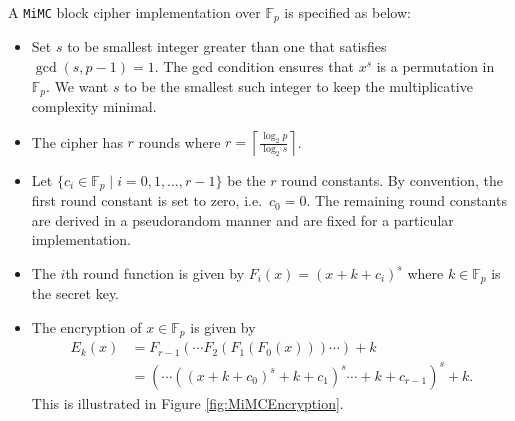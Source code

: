 \documentclass[10pt]{article}
\begin{document}
A \texttt{MiMC} block cipher implementation over $\mathbb{F}_p$ is specified as below:
\begin{itemize}
  \item Set $s$ to be smallest integer greater than one that satisfies $\gcd(s, p-1)=1$. The gcd condition ensures that $x^s$ is a permutation in $\mathbb{F}_p$. We want $s$ to be the smallest such integer to keep the multiplicative complexity minimal.
  \item The cipher has $r$ rounds where $r = \left\lceil \frac{\log_2 p}{\log_2 s}  \right\rceil$.
  \item Let $\{c_i \in \mathbb{F}_p \mid i=0,1,\ldots,r-1 \}$ be the $r$ round constants. By convention, the first round constant is set to zero, i.e.~$c_0= 0$. The remaining round constants are derived in a pseudorandom manner and are fixed for a particular implementation.
  \item The $i$th round function is given by $F_i(x) = (x + k + c_i)^s$ where $k \in \mathbb{F}_p$ is the secret key.
  \item The encryption of $x \in \mathbb{F}_p$ is given by
    \begin{align*}
      E_k(x) & = F_{r-1}(\cdots F_2(F_1(F_0(x))) \cdots) + k\\
             & = \left(\cdots \left((x+k+c_0)^s + k + c_1\right)^s \cdots + k + c_{r-1}\right)^s + k.
    \end{align*}
    This is illustrated in Figure \ref{fig:MiMCEncryption}.
\end{itemize}
\end{document}
